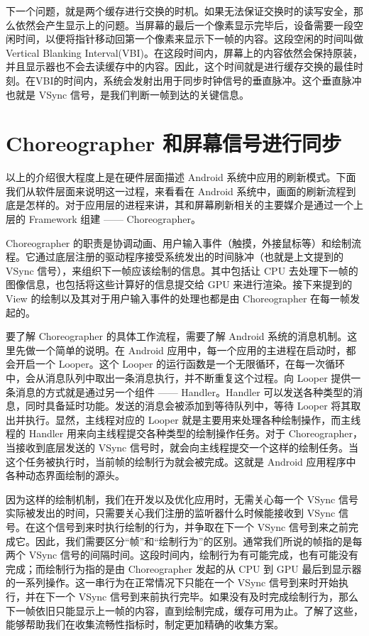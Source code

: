 下一个问题，就是两个缓存进行交换的时机。如果无法保证交换时的读写安全，那么依然会产生显示上的问题。当屏幕的最后一个像素显示完毕后，设备需要一段空闲时间，以便将指针移动回第一个像素来显示下一帧的内容。这段空闲的时间叫做 Vertical Blanking Interval(VBI)。在这段时间内，屏幕上的内容依然会保持原装，并且显示器也不会去读缓存中的内容。因此，这个时间就是进行缓存交换的最佳时刻。在VBI的时间内，系统会发射出用于同步时钟信号的垂直脉冲。这个垂直脉冲也就是 VSync 信号，是我们判断一帧到达的关键信息。

\section{Choreographer 和屏幕信号进行同步}

以上的介绍很大程度上是在硬件层面描述 Android 系统中应用的刷新模式。下面我们从软件层面来说明这一过程，来看看在 Android 系统中，画面的刷新流程到底是怎样的。对于应用层的进程来讲，其和屏幕刷新相关的主要媒介是通过一个上层的 Framework 组建 —— Choreographer。

Choreographer 的职责是协调动画、用户输入事件（触摸，外接鼠标等）和绘制流程。它通过底层注册的驱动程序接受系统发出的时间脉冲（也就是上文提到的 VSync 信号），来组织下一帧应该绘制的信息。其中包括让 CPU 去处理下一帧的图像信息，也包括将这些计算好的信息提交给 GPU 来进行渲染。接下来提到的 View 的绘制以及其对于用户输入事件的处理也都是由 Choreographer 在每一帧发起的。

要了解 Choreographer 的具体工作流程，需要了解 Android 系统的消息机制。这里先做一个简单的说明。在 Android 应用中，每一个应用的主进程在启动时，都会开启一个 Looper。这个 Looper 的运行函数是一个无限循环，在每一次循环中，会从消息队列中取出一条消息执行，并不断重复这个过程。向 Looper 提供一条消息的方式就是通过另一个组件 —— Handler。Handler 可以发送各种类型的消息，同时具备延时功能。发送的消息会被添加到等待队列中，等待 Looper 将其取出并执行。显然，主线程对应的 Looper 就是主要用来处理各种绘制操作，而主线程的 Handler 用来向主线程提交各种类型的绘制操作任务。对于 Choreographer，当接收到底层发送的 VSync 信号时，就会向主线程提交一个这样的绘制任务。当这个任务被执行时，当前帧的绘制行为就会被完成。这就是 Android 应用程序中各种动态界面绘制的源头。

因为这样的绘制机制，我们在开发以及优化应用时，无需关心每一个 VSync 信号实际被发出的时间，只需要关心我们注册的监听器什么时候能接收到 VSync 信号。在这个信号到来时执行绘制的行为，并争取在下一个 VSync 信号到来之前完成它。因此，我们需要区分“帧”和“绘制行为”的区别。通常我们所说的帧指的是每两个 VSync 信号的间隔时间。这段时间内，绘制行为有可能完成，也有可能没有完成；而绘制行为指的是由 Choreographer 发起的从 CPU 到 GPU 最后到显示器的一系列操作。这一串行为在正常情况下只能在一个 VSync 信号到来时开始执行，并在下一个 VSync 信号到来前执行完毕。如果没有及时完成绘制行为，那么下一帧依旧只能显示上一帧的内容，直到绘制完成，缓存可用为止。了解了这些，能够帮助我们在收集流畅性指标时，制定更加精确的收集方案。


